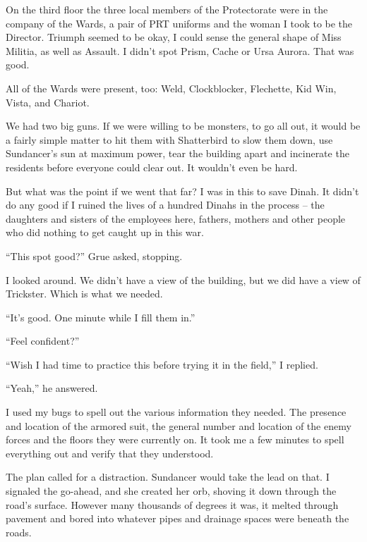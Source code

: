On the third floor the three local members of the Protectorate were in the company of the Wards, a pair of PRT uniforms and the woman I took to be the Director.  Triumph seemed to be okay, I could sense the general shape of Miss Militia, as well as Assault.  I didn't spot Prism, Cache or Ursa Aurora.  That was good.



All of the Wards were present, too:  Weld, Clockblocker, Flechette, Kid Win, Vista, and Chariot.



We had two big guns.  If we were willing to be monsters, to go all out, it would be a fairly simple matter to hit them with Shatterbird to slow them down, use Sundancer's sun at maximum power, tear the building apart and incinerate the residents before everyone could clear out.  It wouldn't even be hard.



But what was the point if we went that far?  I was in this to save Dinah.  It didn't do any good if I ruined the lives of a hundred Dinahs in the process – the daughters and sisters of the employees here, fathers, mothers and other people who did nothing to get caught up in this war.



``This spot good?'' Grue asked, stopping.



I looked around.  We didn't have a view of the building, but we did have a view of Trickster.  Which is what we needed.



``It's good.  One minute while I fill them in.''



``Feel confident?''



``Wish I had time to practice this before trying it in the field,'' I replied.



``Yeah,'' he answered.



I used my bugs to spell out the various information they needed.  The presence and location of the armored suit, the general number and location of the enemy forces and the floors they were currently on.  It took me a few minutes to spell everything out and verify that they understood.



The plan called for a distraction.  Sundancer would take the lead on that.  I signaled the go-ahead, and she created her orb, shoving it down through the road's surface.  However many thousands of degrees it was, it melted through pavement and bored into whatever pipes and drainage spaces were beneath the roads.



